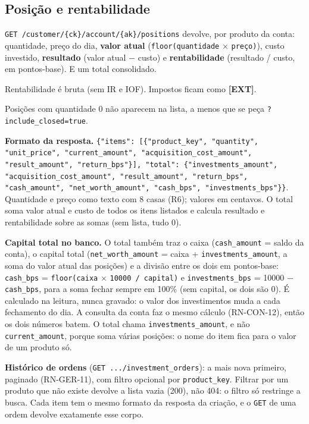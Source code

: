 \documentclass[11pt,a4paper]{article}
\newcommand{\dec}{\textbf{[DEC]}}          %
\newcommand{\ext}{\textbf{[EXT]}}          %
\newcommand{\tb}[1]{\texttt{#1}}           %
\begin{document}
\subsection{Posição e rentabilidade}

\begin{regras}
  \item[RN-POS-01 \dec] \tb{GET /customer/\{ck\}/account/\{ak\}/positions} devolve, por produto da conta: quantidade,
  preço do dia, \textbf{valor atual} (\tb{floor(quantidade} $\times$ \tb{preço)}), custo
  investido, \textbf{resultado} (valor atual $-$ custo) e \textbf{rentabilidade} (resultado /
  custo, em pontos-base). E um total consolidado.
  \item[RN-POS-02 \dec] Rentabilidade é bruta (sem IR e IOF). Impostos ficam como \ext.
  \item[RN-POS-03 \dec] Posições com quantidade 0 não aparecem na lista, a menos que se peça
  \tb{?include_closed=true}.
  \item[RN-POS-04 \dec] \textbf{Formato da resposta.} \tb{\{"items": [\{"product_key", "quantity",
  "unit_price", "current_amount", "acquisition_cost_amount", "result_amount", "return_bps"\}], "total":
  \{"investments_amount", "acquisition_cost_amount", "result_amount", "return_bps", "cash_amount",
  "net_worth_amount", "cash_bps", "investments_bps"\}\}}. Quantidade e preço
  como texto com 8 casas (R6); valores em centavos. O total soma valor atual e custo de todos os
  itens listados e calcula resultado e rentabilidade sobre as somas (sem lista, tudo 0).
  \item[RN-POS-06 \dec] \textbf{Capital total no banco.} O total também traz o caixa
  (\tb{cash_amount} = saldo da conta), o capital total
  (\tb{net_worth_amount} = caixa + \tb{investments_amount}, a soma do valor atual das posições) e a divisão entre os dois em
  pontos-base: \tb{cash_bps} = \tb{floor(caixa} $\times$ \tb{10000 / capital)} e
  \tb{investments_bps} = 10000 $-$ \tb{cash_bps}, para a soma fechar sempre em 100\% (sem capital,
  os dois são 0). É calculado na leitura, nunca gravado: o valor dos investimentos muda a cada
  fechamento do dia. A consulta da conta faz o mesmo cálculo (RN-CON-12), então os dois números batem.
  O total chama \tb{investments_amount}, e não \tb{current_amount}, porque soma várias posições: o
  nome do item fica para o valor de um produto só.
  \item[RN-POS-05 \dec] \textbf{Histórico de ordens} (\tb{GET .../investment_orders}): a mais nova
  primeiro, paginado (RN-GER-11), com filtro opcional por \tb{product_key}. Filtrar por um produto
  que não existe devolve a lista vazia (200), não 404: o filtro só restringe a busca. Cada item tem o
  mesmo formato da resposta da criação, e o \tb{GET} de uma ordem devolve exatamente esse corpo.
\end{regras}
\end{document}
